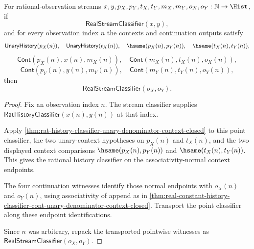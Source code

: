 \begin{theorem}
\label{thm:real-stream-classifier-unary-denominator-context-closed}
For rational-observation streams
$x,y,p_X,p_Y,t_X,t_Y,m_X,m_Y,o_X,o_Y:\mathbb{N}\to\Hist$, if
$$
\mathsf{RealStreamClassifier}(x,y),
$$
and for every observation index $n$ the contexts and continuation outputs
satisfy
$$
\mathsf{UnaryHistory}(p_X(n)),\quad \mathsf{UnaryHistory}(t_X(n)),\quad
\hsame(p_X(n),p_Y(n)),\quad \hsame(t_X(n),t_Y(n)),
$$
$$
\mathsf{Cont}(p_X(n),x(n),m_X(n)),\quad
\mathsf{Cont}(m_X(n),t_X(n),o_X(n)),
$$
$$
\mathsf{Cont}(p_Y(n),y(n),m_Y(n)),\quad
\mathsf{Cont}(m_Y(n),t_Y(n),o_Y(n)),
$$
then
$$
\mathsf{RealStreamClassifier}(o_X,o_Y).
$$
\end{theorem}
\begin{proof}
Fix an observation index $n$. The stream classifier supplies
$\mathsf{RatHistoryClassifier}(x(n),y(n))$ at that index.

Apply \autoref{thm:rat-history-classifier-unary-denominator-context-closed} to
this point classifier, the two unary-context hypotheses on $p_X(n)$ and
$t_X(n)$, and the two displayed context comparisons
$\hsame(p_X(n),p_Y(n))$ and $\hsame(t_X(n),t_Y(n))$. This gives the rational
history classifier on the associativity-normal context endpoints.

The four continuation witnesses identify those normal endpoints with $o_X(n)$
and $o_Y(n)$, using associativity of append as in
\autoref{thm:real-constant-history-classifier-cont-unary-denominator-context-closed}.
Transport the point classifier along these endpoint identifications.

Since $n$ was arbitrary, repack the transported pointwise witnesses as
$\mathsf{RealStreamClassifier}(o_X,o_Y)$.
\end{proof}


